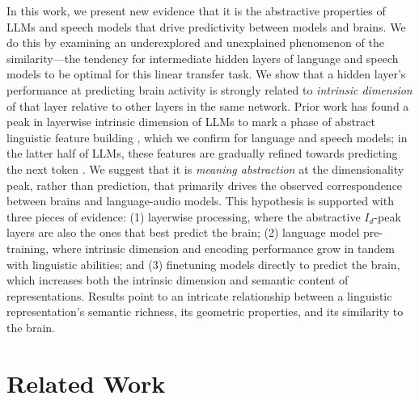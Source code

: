 \documentclass{article}
\theoremstyle{plain}
\theoremstyle{definition}
\theoremstyle{remark}
\begin{document}
In this work, we present new evidence that it is the abstractive properties of LLMs and speech models that drive predictivity between models and brains. We do this by examining an underexplored and unexplained phenomenon of the similarity---the tendency for intermediate hidden layers of language and speech models to be optimal for this linear transfer task. We show that a hidden layer's performance at predicting brain activity is strongly related to \emph{intrinsic dimension} of that layer relative to other layers in the same network. 
Prior work has found a peak in layerwise intrinsic dimension of LLMs to mark a phase of abstract linguistic feature building \citep{cheng2025emergence}, which we confirm for language and speech models; in the latter half of LLMs, these features are gradually refined towards predicting the next token \citep{lad2025remarkable,skean2025layer}. We suggest that it is \emph{meaning abstraction} at the dimensionality peak, rather than prediction, that primarily drives the observed correspondence between brains and language-audio models.
This hypothesis is supported with three pieces of evidence: (1) layerwise processing, where the abstractive $I_d$-peak layers are also the ones that best predict the brain; (2) language model pre-training, where intrinsic dimension and encoding performance grow in tandem with linguistic abilities; and (3) finetuning models directly to predict the brain, which increases both the intrinsic dimension and semantic content of representations. Results point to an intricate relationship between a linguistic representation's semantic richness, its geometric properties, and its similarity to the brain. 

\section{Related Work}
\end{document}
